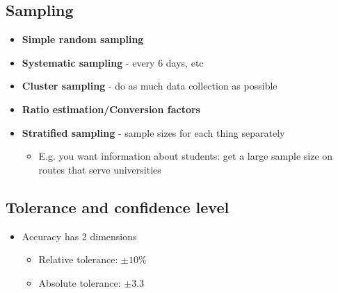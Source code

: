 \documentclass[11pt]{article}
\begin{document}
\subsection{Sampling}
\label{sec:org2b4ddea}
\begin{itemize}
\item \textbf{Simple random sampling}
\item \textbf{Systematic sampling} - every 6 days, etc
\item \textbf{Cluster sampling} - do as much data collection as possible
\item \textbf{Ratio estimation/Conversion factors}
\item \textbf{Stratified sampling} - sample sizes for each thing separately
\begin{itemize}
\item E.g. you want information about students: get a large sample size on routes that serve universities
\end{itemize}
\end{itemize}

\subsection{Tolerance and confidence level}
\label{sec:org48c88de}
\begin{itemize}
\item Accuracy has 2 dimensions
\begin{itemize}
\item Relative tolerance: \(\pm 10\%\)
\item Absolute tolerance: \(\pm 3.3\)
\end{itemize}
\end{itemize}
\end{document}
